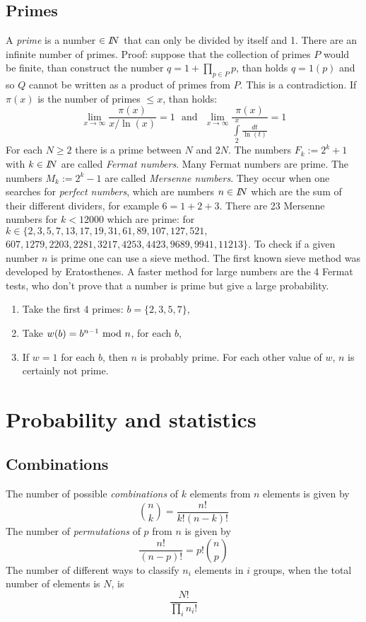 \documentclass[a4paper,fancyheadings,twoside]{report}
\begin{document}
\section{Primes}
A {\it prime} is a number $\in I\hspace{-1mm}N$ that can only be divided by itself and
1. There are an infinite number of primes. Proof: suppose that the collection of primes
$P$ would be finite, than construct the number $q=1+\prod\limits_{p\in P}p$,
than holds $q=1(p)$ and so $Q$ cannot be written as a product of primes from
$P$. This is a contradiction.
\npar
If $\pi(x)$ is the number of primes $\leq x$, than holds:
\[
\lim_{x\rightarrow\infty}\frac{\pi(x)}{x/\ln(x)}=1~~~\mbox{and}~~~
\lim_{x\rightarrow\infty}\frac{\pi(x)}{\int\limits_2^x\frac{dt}{\ln(t)}}=1
\]
For each $N\geq2$ there is a prime between $N$ and $2N$.
\npar
The numbers $F_k:=2^k+1$ with $k\in I\hspace{-1mm}N$ are called {\it Fermat numbers}.
Many Fermat numbers are prime.
\npar
The numbers $M_k:=2^k-1$ are called {\it Mersenne numbers}. They occur when
one searches for {\it perfect numbers}, which are numbers $n\in I\hspace{-1mm}N$ which are
the sum of their different dividers, for example $6=1+2+3$. There are 23
Mersenne numbers for $k<12000$ which are prime:
for $k\in\{2,3,5,7,13,17,19,31,61,89,107,127,521,$
$607,1279,2203,2281,3217,4253,4423,9689,9941,11213\}$.
\npar
To check if a given number $n$ is prime one can use a sieve method. The
first known sieve method was developed by Eratosthenes. A faster method for
large numbers are the 4 Fermat tests, who don't prove that a number is prime
but give a large probability.
\begin{enumerate}
\item Take the first 4 primes: $b=\{2,3,5,7\}$,
\item Take $w(b)=b^{n-1}~{\rm mod}~n$, for each $b$,
\item If $w=1$ for each $b$, then $n$ is probably prime. For each other value
      of $w$, $n$ is certainly not prime.
\end{enumerate}


\chapter{Probability and statistics}
\section{Combinations}
The number of possible {\it combinations} of $k$ elements from $n$ elements is
given by
\[
{n\choose k}=\frac{n!}{k!(n-k)!}
\]
The number of {\it permutations} of $p$ from $n$ is given by
\[
\frac{n!}{(n-p)!}=p!{n\choose p}
\]
The number of different ways to classify $n_i$ elements in $i$ groups, when
the total number of elements is $N$, is
\[
\frac{N!}{\prod\limits_i n_i!}
\]
\end{document}
